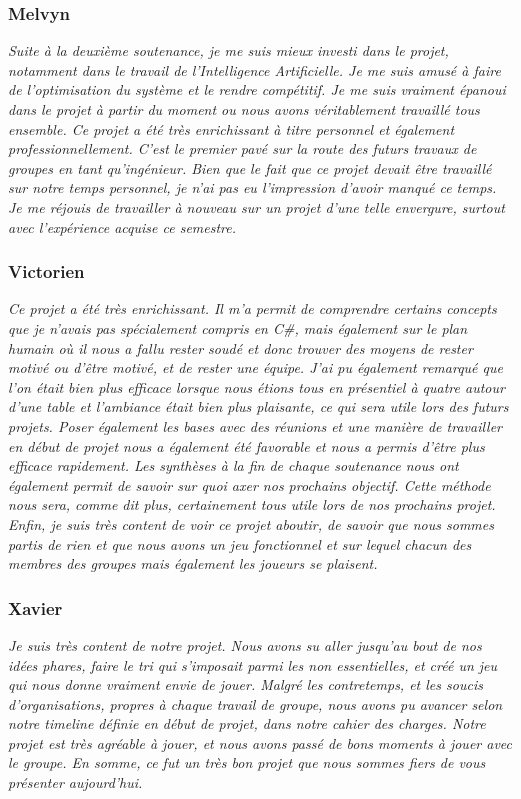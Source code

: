 \documentclass[a4paper,12pt]{article}
\newcommand{\AI}{Intelligence Artificielle}
\begin{document}
        
        \subsubsection{Melvyn}
        \textit{Suite à la deuxième soutenance, je me suis mieux investi dans le projet, notamment dans le travail de l'\AI. Je me suis amusé à faire de l'optimisation du système et le rendre compétitif. Je me suis vraiment épanoui dans le projet à partir du moment ou nous avons véritablement travaillé tous ensemble. Ce projet a été très enrichissant à titre personnel et également professionnellement. C'est le premier pavé sur la route des futurs travaux de groupes en tant qu'ingénieur. Bien que le fait que ce projet devait être travaillé sur notre temps personnel, je n'ai pas eu l'impression d'avoir manqué ce temps. Je me réjouis de travailler à nouveau sur un projet d'une telle envergure, surtout avec l'expérience acquise ce semestre.}
        \clearpage
        \subsubsection{Victorien}
             \textit{Ce projet a été très enrichissant. Il m'a permit de comprendre certains concepts que je n'avais pas spécialement compris en C\#, mais également sur le plan humain où il nous a fallu rester soudé et donc trouver des moyens de rester motivé ou d'être motivé, et de rester une équipe. J'ai pu également remarqué que l'on était bien plus efficace lorsque nous étions tous en présentiel à quatre autour d'une table et l'ambiance était bien plus plaisante, ce qui sera utile lors des futurs projets. Poser également les bases avec des réunions et une manière de travailler en début de projet nous a également été favorable et nous a permis d'être plus efficace rapidement. Les synthèses à la fin de chaque soutenance nous ont également permit de savoir sur quoi axer nos prochains objectif. Cette méthode nous sera, comme dit plus, certainement tous utile lors de nos prochains projet. Enfin, je suis très content de voir ce projet aboutir, de savoir que nous sommes partis de rien et que nous avons un jeu fonctionnel et sur lequel chacun des membres des groupes mais également les joueurs se plaisent.}
        
        \subsubsection{Xavier}
             \textit{Je suis très content de notre projet. Nous avons su aller jusqu'au bout de nos idées phares, faire le tri qui s'imposait parmi les non essentielles, et créé un jeu qui nous donne vraiment envie de jouer. Malgré les contretemps, et les soucis d'organisations, propres à chaque travail de groupe, nous avons pu avancer selon notre timeline définie en début de projet, dans notre cahier des charges. Notre projet est très agréable à jouer, et nous avons passé de bons moments à jouer avec le groupe. En somme, ce fut un très bon projet que nous sommes fiers de vous présenter aujourd'hui.}
        
\end{document}
